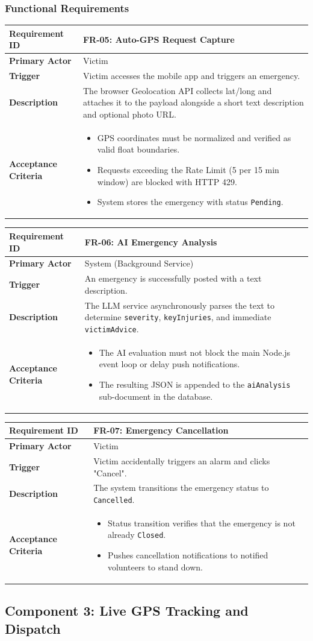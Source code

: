 \documentclass[12pt,a4paper]{article}
\newcommand{\frbox}[5]{%
  \begin{table}[H]
  \centering
  \begin{tabularx}{\textwidth}{|l|X|}
  \hline
  \rowcolor{lightorange}
  \textbf{Requirement ID} & \textbf{#1} \\
  \hline
  \textbf{Primary Actor} & #2 \\
  \hline
  \textbf{Trigger} & #3 \\
  \hline
  \textbf{Description} & #4 \\
  \hline
  \rowcolor{lightorange}
  \textbf{Acceptance Criteria} & #5 \\
  \hline
  \end{tabularx}
  \end{table}
}
\begin{document}
\subsubsection*{Functional Requirements}

\frbox{FR-05: Auto-GPS Request Capture}
{Victim}
{Victim accesses the mobile app and triggers an emergency.}
{The browser Geolocation API collects lat/long and attaches it to the payload alongside a short text description and optional photo URL.}
{%
\begin{itemize}[leftmargin=1.5em]
  \item GPS coordinates must be normalized and verified as valid float boundaries.
  \item Requests exceeding the Rate Limit (5 per 15 min window) are blocked with HTTP 429.
  \item System stores the emergency with status \texttt{Pending}.
\end{itemize}
}

\frbox{FR-06: AI Emergency Analysis}
{System (Background Service)}
{An emergency is successfully posted with a text description.}
{The LLM service asynchronously parses the text to determine \texttt{severity}, \texttt{keyInjuries}, and immediate \texttt{victimAdvice}.}
{%
\begin{itemize}[leftmargin=1.5em]
  \item The AI evaluation must not block the main Node.js event loop or delay push notifications.
  \item The resulting JSON is appended to the \texttt{aiAnalysis} sub-document in the database.
\end{itemize}
}

\frbox{FR-07: Emergency Cancellation}
{Victim}
{Victim accidentally triggers an alarm and clicks "Cancel".}
{The system transitions the emergency status to \texttt{Cancelled}.}
{%
\begin{itemize}[leftmargin=1.5em]
  \item Status transition verifies that the emergency is not already \texttt{Closed}.
  \item Pushes cancellation notifications to notified volunteers to stand down.
\end{itemize}
}


\subsection{Component 3: Live GPS Tracking and Dispatch}
\end{document}
